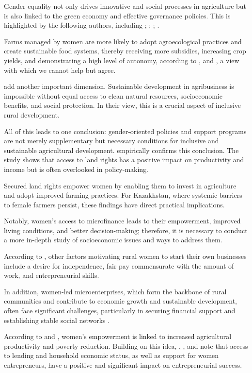 ﻿\documentclass[pdflatex,sn-mathphys-ay]{sn-jnl}
\begin{document}
Gender equality not only drives innovative and social processes in
agriculture but is also linked to the green economy and effective
governance policies. This is highlighted by the following authors,
including \citet{ref57}; \citet{ref31}; \citet{ref05}; \citet{ref106}.

Farms managed by women are more likely to adopt agroecological practices
and create sustainable food systems, thereby receiving more subsidies,
increasing crop yields, and demonstrating a high level of autonomy,
according to \citet{ref67}, and \citet{ref50},
a view with which we cannot help but agree.

\citet{ref92} add another important dimension.
Sustainable development in agribusiness is impossible without equal
access to clean natural resources, socioeconomic benefits, and social
protection. In their view, this is a crucial aspect of inclusive rural
development.

All of this leads to one conclusion: gender-oriented policies and
support programs are not merely supplementary but necessary conditions
for inclusive and sustainable agricultural development. \citet{ref20} empirically confirms this conclusion. The study shows that
access to land rights has a positive impact on productivity and income
but is often overlooked in policy-making.

Secured land rights empower women by enabling them to invest in
agriculture and adopt improved farming practices. For Kazakhstan, where
systemic barriers to female farmers persist, these findings have direct
practical implications.

Notably, women's access to microfinance
\citep{ref60} leads to their empowerment, improved
living conditions, and better decision-making; therefore, it is
necessary to conduct a more in-depth study of socioeconomic issues and
ways to address them.

According to \citet{ref91}, other factors
motivating rural women to start their own businesses include a desire
for independence, fair pay commensurate with the amount of work, and
entrepreneurial skills.

In addition, women-led microenterprises, which form the backbone of
rural communities and contribute to economic growth and sustainable
development, often face significant challenges, particularly in securing
financial support and establishing stable social networks \citep{ref14}.

According to \citet{ref68} and \citet{ref46},
women's empowerment is linked to increased agricultural productivity and
poverty reduction. Building on this idea, \citet{ref94},
\citet{ref88}, and \citet{ref16} note that
access to lending and household economic status, as well as support for
women entrepreneurs, have a positive and significant impact on
entrepreneurial success.
\end{document}
